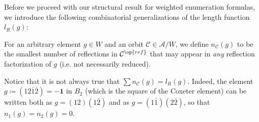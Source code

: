 Before we proceed with our structural result for weighted enumeration formulas, we introduce the following combinatorial generalizations of the length function $l_R(g)$:

\begin{defi}\label{Defn: special reflection lengths n_C}
For an arbitrary element $g\in W$ and an orbit $\mathcal{C}\in\mathcal{A}/W$, we define $n_{\mathcal{C}}(g)$ to be the smallest number of reflections in $\mathcal{C}^{\op{ref}}$ that may appear in \emph{any} reflection factorization of $g$ \textup{(}i.e. not necessarily reduced\textup{)}.
\end{defi}

\begin{rema}
Notice that it is not always true that $\sum n_{\mathcal{C}}(g)=l_R(g)$. Indeed, the element $g\coloneqq (12\bar{1}\bar{2})=-\bm 1$ in $B_2$ (which is the square of the Coxeter element) can be written both as $g=(12)(1\bar{2})$ and as $g=(1\bar{1})(2\bar{2})$, so that $n_1(g)=n_2(g)=0$.
\end{rema}

